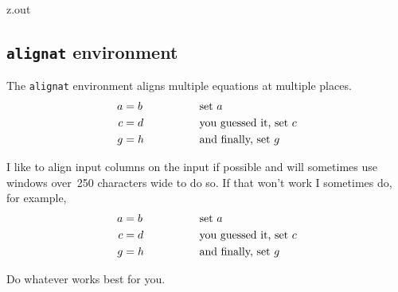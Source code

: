 \begin{VerbatimOut}{z.out}

\subsection{\texttt{alignat} environment}

The \verb+alignat+ environment aligns multiple equations at multiple places.
\begin{alignat}{2}
  a &= b& \qquad\qquad& \text{set $a$}\\
  c &= d& &             \text{you guessed it, set $c$}\notag\\
  g &= h& &             \text{and finally, set $g$}
\end{alignat}

I like to align input columns on the input if possible
and will sometimes use windows over~250 characters wide to do so.
If that won't work I sometimes do,
for example,
\begin{alignat}{2}
  a
    &= b
    & \qquad\qquad
    & \text{set $a$}\\
  c
    &= d
    &
    &\text{you guessed it, set $c$}\notag\\
  g
    &= h
    &
    &\text{and finally, set $g$}
\end{alignat}

Do whatever works best for you.

\end{VerbatimOut}

\MyIO


